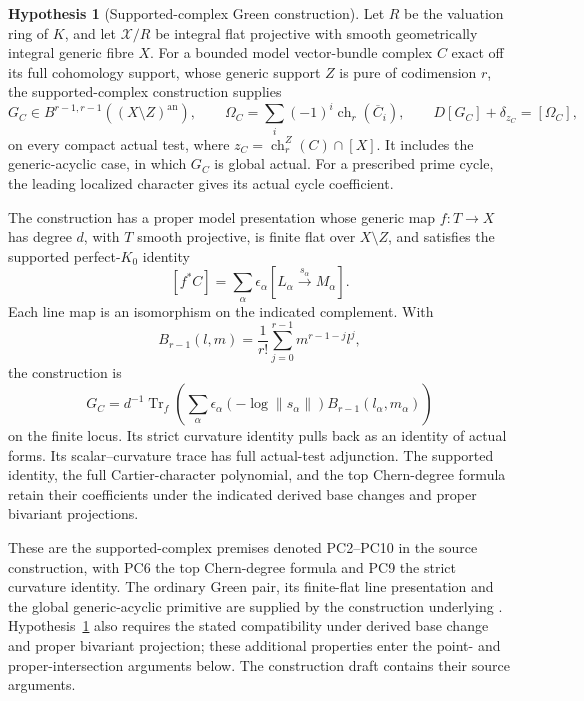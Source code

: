 \documentclass[11pt,a4paper]{article}
\theoremstyle{definition}
\newtheorem{hypothesis}[theorem]{Hypothesis}
\theoremstyle{remark}
\numberwithin{equation}{section}
\newcommand{\an}{\mathrm{an}}
\begin{document}
\begin{hypothesis}[Supported-complex Green construction]\label{hyp:height-supported}
Let $R$ be the valuation ring of $K$, and let $\mathcal X/R$ be integral flat projective with smooth geometrically integral generic fibre $X$. For a bounded model vector-bundle complex $C$ exact off its full cohomology support, whose generic support $Z$ is pure of codimension $r$, the supported-complex construction supplies
\[
 G_C\in B^{r-1,r-1}((X\setminus Z)^{\an}),\qquad
 \Omega_C=\sum_i(-1)^i\operatorname{ch}_r(\overline C_i),
 \qquad D[G_C]+\delta_{z_C}=[\Omega_C],
\]
on every compact actual test, where
$z_C=\operatorname{ch}_r^Z(C)\cap[X]$. It includes the generic-acyclic case, in which $G_C$ is global actual. For a prescribed prime cycle, the leading localized character gives its actual cycle coefficient.

The construction has a proper model presentation whose generic map $f:T\to X$ has degree $d$, with $T$ smooth projective, is finite flat over $X\setminus Z$, and satisfies the supported perfect-$K_0$ identity
\[
 [f^*C]=\sum_\alpha\epsilon_\alpha
 [L_\alpha\xrightarrow{s_\alpha}M_\alpha].
\]
Each line map is an isomorphism on the indicated complement. With
\[
 B_{r-1}(l,m)=\frac1{r!}\sum_{j=0}^{r-1}m^{r-1-j}l^j,
\]
the construction is
\[
 G_C=d^{-1}\operatorname{Tr}_{f}
 \left(\sum_\alpha\epsilon_\alpha
 (-\log\|s_\alpha\|)B_{r-1}(l_\alpha,m_\alpha)\right)
\]
on the finite locus. Its strict curvature identity pulls back as an identity of actual forms. Its scalar--curvature trace has full actual-test adjunction. The supported identity, the full Cartier-character polynomial, and the top Chern-degree formula retain their coefficients under the indicated derived base changes and proper bivariant projections.
\end{hypothesis}

These are the supported-complex premises denoted PC2--PC10 in the source construction, with PC6 the top Chern-degree formula and PC9 the strict curvature identity. The ordinary Green pair, its finite-flat line presentation and the global generic-acyclic primitive are supplied by the construction underlying \cite[Theorem 1.1]{ChowGreenPairs}. Hypothesis~\ref{hyp:height-supported} also requires the stated compatibility under derived base change and proper bivariant projection; these additional properties enter the point- and proper-intersection arguments below. The construction draft \cite{GC} contains their source arguments.
\end{document}

